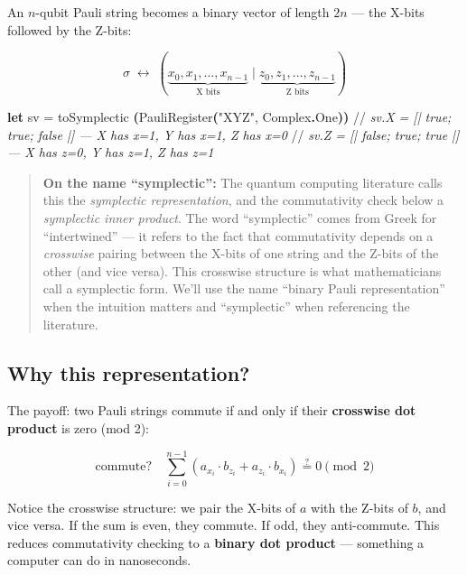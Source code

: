 \documentclass[
  11pt,
  oneside]{book}
\newenvironment{Shaded}{\begin{snugshade}}{\end{snugshade}}
\newcommand{\CommentTok}[1]{\textcolor[rgb]{0.56,0.35,0.01}{\textit{#1}}}
\newcommand{\KeywordTok}[1]{\textcolor[rgb]{0.13,0.29,0.53}{\textbf{#1}}}
\newcommand{\NormalTok}[1]{#1}
\newcommand{\OperatorTok}[1]{\textcolor[rgb]{0.81,0.36,0.00}{\textbf{#1}}}
\newcommand{\StringTok}[1]{\textcolor[rgb]{0.31,0.60,0.02}{#1}}
\begin{document}
An \(n\)-qubit Pauli string becomes a binary vector of length \(2n\) ---
the X-bits followed by the Z-bits:

\[\sigma \;\leftrightarrow\; (\underbrace{x_0, x_1, \ldots, x_{n-1}}_{\text{X bits}} \mid \underbrace{z_0, z_1, \ldots, z_{n-1}}_{\text{Z bits}})\]

\begin{Shaded}
\begin{Highlighting}[]
\KeywordTok{let}\NormalTok{ sv = toSymplectic }\OperatorTok{(}\NormalTok{PauliRegister}\OperatorTok{(}\StringTok{"XYZ"}\NormalTok{, Complex}\KeywordTok{.}\NormalTok{One}\OperatorTok{))}
\NormalTok{//}\CommentTok{ sv.X = [| true; true; false |]   --- X has x=1, Y has x=1, Z has x=0}
\NormalTok{//}\CommentTok{ sv.Z = [| false; true; true |]   --- X has z=0, Y has z=1, Z has z=1}
\end{Highlighting}
\end{Shaded}

\begin{quote}
\textbf{On the name ``symplectic'':} The quantum computing literature
calls this the \emph{symplectic representation}, and the commutativity
check below a \emph{symplectic inner product}. The word ``symplectic''
comes from Greek for ``intertwined'' --- it refers to the fact that
commutativity depends on a \emph{crosswise} pairing between the X-bits
of one string and the Z-bits of the other (and vice versa). This
crosswise structure is what mathematicians call a symplectic form. We'll
use the name ``binary Pauli representation'' when the intuition matters
and ``symplectic'' when referencing the literature.
\end{quote}

\subsection{Why this representation?}\label{why-this-representation}

The payoff: two Pauli strings commute if and only if their
\textbf{crosswise dot product} is zero (mod 2):

\[\text{commute?} \quad \sum_{i=0}^{n-1} (a_{x_i} \cdot b_{z_i} + a_{z_i} \cdot b_{x_i}) \stackrel{?}{=} 0 \pmod{2}\]

Notice the crosswise structure: we pair the X-bits of \(a\) with the
Z-bits of \(b\), and vice versa. If the sum is even, they commute. If
odd, they anti-commute. This reduces commutativity checking to a
\textbf{binary dot product} --- something a computer can do in
nanoseconds.
\end{document}
